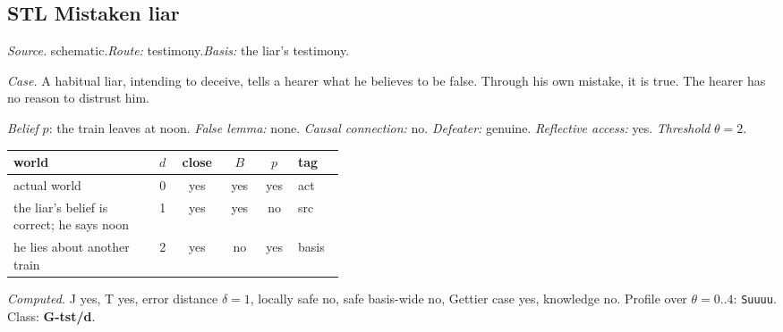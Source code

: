 \subsection*{STL \enspace Mistaken liar}
\noindent\textit{Source.} schematic.\quad \textit{Route:} testimony.\quad \textit{Basis:} the liar's testimony.\par
\noindent\textit{Case.} A habitual liar, intending to deceive, tells a hearer what he believes to be false. Through his own mistake, it is true. The hearer has no reason to distrust him.\par
\noindent\textit{Belief} $p$: the train leaves at noon.
 \textit{False lemma:} none. \textit{Causal connection:} no. \textit{Defeater:} genuine. \textit{Reflective access:} yes. \textit{Threshold} $\theta = 2$.\par
\begin{center}\begin{tabular}{@{}p{0.43\linewidth}rcccl@{}}
world & $d$ & close & $B$ & $p$ & tag \\ \midrule
actual world & 0 & yes & yes & yes & act \\
the liar's belief is correct; he says noon & 1 & yes & yes & no & src \\
he lies about another train & 2 & yes & no & yes & basis \\
\end{tabular}\end{center}
\noindent\textit{Computed.} J yes, T yes, error distance $\delta = 1$, locally safe no, safe basis-wide no, Gettier case yes, knowledge no. Profile over $\theta = 0..4$: \texttt{Suuuu}. Class: \textbf{G-tst/d}.
\par\medskip
